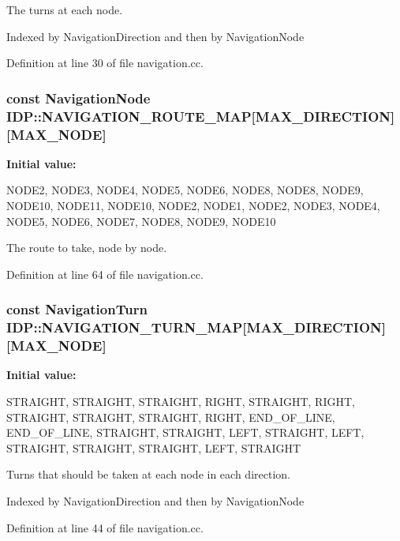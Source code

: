 The turns at each node. 

Indexed by NavigationDirection and then by NavigationNode 

Definition at line 30 of file navigation.cc.

\hypertarget{namespaceIDP_a33ba7fcc78e0c8e5477d2ed6ac18e48f}{
\subsubsection[{NAVIGATION\_\-ROUTE\_\-MAP}]{\setlength{\rightskip}{0pt plus 5cm}const {\bf NavigationNode} {\bf IDP::NAVIGATION\_\-ROUTE\_\-MAP}\mbox{[}MAX\_\-DIRECTION\mbox{]}\mbox{[}MAX\_\-NODE\mbox{]}}}
\label{namespaceIDP_a33ba7fcc78e0c8e5477d2ed6ac18e48f}
{\bfseries Initial value:}
\begin{DoxyCode}
 {
        {NODE2, NODE3, NODE4, NODE5, NODE6, NODE8, NODE8, NODE9, NODE10,
            NODE11, NODE10},
        {NODE2, NODE1, NODE2, NODE3, NODE4, NODE5, NODE6, NODE7, NODE8,
            NODE9, NODE10}
    }
\end{DoxyCode}


The route to take, node by node. 



Definition at line 64 of file navigation.cc.

\hypertarget{namespaceIDP_a0bada0608b684564e235786b3b38c10a}{
\subsubsection[{NAVIGATION\_\-TURN\_\-MAP}]{\setlength{\rightskip}{0pt plus 5cm}const {\bf NavigationTurn} {\bf IDP::NAVIGATION\_\-TURN\_\-MAP}\mbox{[}MAX\_\-DIRECTION\mbox{]}\mbox{[}MAX\_\-NODE\mbox{]}}}
\label{namespaceIDP_a0bada0608b684564e235786b3b38c10a}
{\bfseries Initial value:}
\begin{DoxyCode}
 {
        {STRAIGHT, STRAIGHT, STRAIGHT, RIGHT, STRAIGHT, RIGHT, STRAIGHT,
            STRAIGHT, STRAIGHT, RIGHT, END_OF_LINE},
        {END_OF_LINE, STRAIGHT, STRAIGHT, LEFT, STRAIGHT, LEFT, STRAIGHT,
            STRAIGHT, STRAIGHT, LEFT, STRAIGHT}
    }
\end{DoxyCode}


Turns that should be taken at each node in each direction. 

Indexed by NavigationDirection and then by NavigationNode 

Definition at line 44 of file navigation.cc.

